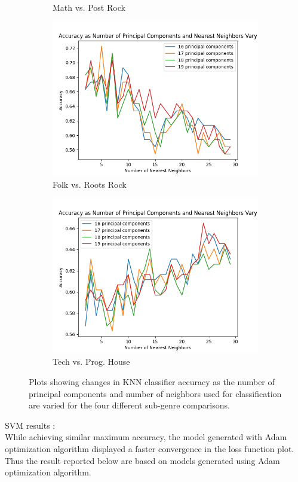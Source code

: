 \documentclass[letterpaper, 12 pt, conference]{ieeeconf}  %
\begin{document}
\begin{figure}[!hb]
\begin{subfigure}{.23\textwidth}
    \caption{Math vs. Post Rock}
    \label{fig:knngraph2}
  \end{subfigure}
\newline
  \begin{subfigure}{.23\textwidth}
    \centering
    \includegraphics[width=.8\linewidth]{knnplot_frrr.png}
    \caption{Folk vs. Roots Rock}
    \label{fig:knngraph3}
  \end{subfigure}
  \begin{subfigure}{.23\textwidth}
    \centering
    \includegraphics[width=.8\linewidth]{knnplot_thph.png}
    \caption{Tech vs. Prog. House}
    \label{fig:knngraph4}
  \end{subfigure}
  \caption{Plots showing changes in KNN classifier accuracy as the number of principal components and number of neighbors used for classification are varied for the four different sub-genre comparisons.}
  \label{fig:knngraphs}
\end{figure}




\par SVM results :\\
\quad While achieving similar maximum accuracy, the model generated with Adam optimization algorithm displayed a faster convergence in the loss function plot. Thus the result reported below are based on models generated using Adam optimization algorithm.
\end{document}
